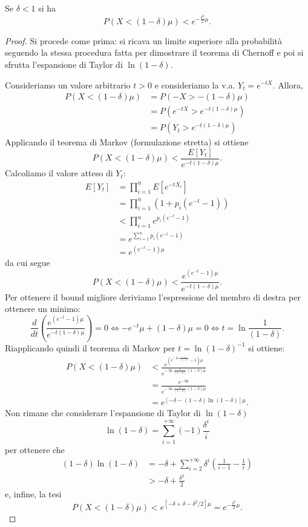 \begin{corollario}
\label{corollario:2chernoff}
Se $\delta < 1$ si ha
\[
P(X<(1-\delta)\mu) < e^{-\frac{\delta^2}{2}\mu}.
\]
\end{corollario}
\begin{proof}
Si procede come prima: si ricava un limite superiore alla probabilità seguendo la stessa procedura fatta per dimostrare il teorema di Chernoff e poi si sfrutta l'espansione di Taylor di $\ln{(1-\delta)}$.

Consideriamo un valore arbitrario $t>0$ e consideriamo la v.a. $Y_t=e^{-tX}$. Allora,
\begin{align*}
 P(X<(1-\delta)\mu) &= P(-X > -(1-\delta)\mu) \\
 &= P(e^{-tX} > e^{-t(1-\delta)\mu}) \\
 &= P(Y_t > e^{-t(1-\delta)\mu})
\end{align*}
Applicando il teorema di Markov (formulazione stretta) si ottiene
\[
 P(X<(1-\delta)\mu) < \frac{E[Y_t]}{e^{-t(1-\delta)\mu}}.
\]
Calcoliamo il valore atteso di $Y_t$:
\begin{align*}
 E[Y_t]&=\prod_{i=1}^{n}E[e^{-tX_i}] \\
 &=\prod_{i=1}^{n}(1+p_i(e^{-t}-1)) \\
 &< \prod_{i=1}^{n}e^{p_i(e^{-t}-1)} \\
 &= e^{\sum_{i=1}^n p_i(e^{-t}-1)} \\
 &= e^{(e^{-t}-1)\mu}
\end{align*}
da cui segue
\[
 P(X<(1-\delta)\mu) < \frac{e^{(e^{-t}-1)\mu}}{e^{-t(1-\delta)\mu}}.
\]
Per ottenere il bound migliore deriviamo l'espressione del membro di destra per ottenere un minimo:
\[
 \frac{d}{dt}\left(\frac{e^{(e^{-t}-1)\mu}}{e^{-t(1-\delta)\mu}}\right)=0 \Leftrightarrow -e^{-t}\mu+(1-\delta)\mu=0 \Leftrightarrow t=\ln\frac{1}{(1-\delta)}.
\]
Riapplicando quindi il teorema di Markov per $t=\ln(1-\delta)^{-1}$ si ottiene:
\begin{align*}
 P(X<(1-\delta)\mu) &< \frac{e^{\left(e^{-\ln\frac{1}{(1-\delta)}}-1\right)\mu}}{e^{-\ln\frac{1}{(1-\delta)}(1-\delta)\mu}} \\ 
 &= \frac{e^{-\delta\mu}}{e^{-\ln\frac{1}{(1-\delta)}(1-\delta)\mu}} \\
 &= e^{[-\delta -(1-\delta)\ln(1-\delta)]\mu}.
\end{align*}
Non rimane che considerare l'espansione di Taylor di $\ln(1-\delta)$
\[
 \ln(1-\delta)=\sum_{i=1}^{+\infty}(-1)\frac{\delta^i}{i}
\]
per ottenere che 
\begin{align*}
 (1-\delta)\ln(1-\delta)&=-\delta + \sum_{i=2}^{+\infty}\delta^i\left(\frac{1}{i-1}-\frac{1}{i}\right) \\
 &> -\delta + \frac{\delta^2}{2}
\end{align*}
e, infine, la tesi
\[
 P(X<(1-\delta)\mu) < e^{[-\delta + \delta - \delta^2/2]\mu} = e^{-\frac{\delta^2}{2}\mu}.
\]
\end{proof}


